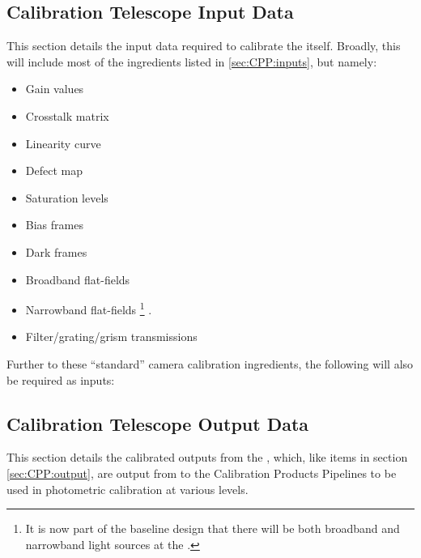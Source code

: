

\subsection{Calibration Telescope Input Data}
\label{sec:CPP:auxTelescope:inputs}
This section details the input data required to calibrate the \auxtelescope itself. Broadly, this will include most of the ingredients listed in \secsymbol\ref{sec:CPP:inputs}, but namely:

\begin{itemize}
	\item Gain values
	\item Crosstalk matrix
	\item Linearity curve
	\item Defect map
	\item Saturation levels
	\item Bias frames
	\item Dark frames
	\item Broadband flat-fields
	\item Narrowband flat-fields \footnote{It is now part of the baseline design that there will be both broadband and narrowband light sources at the \auxtelescope.} .
	\item Filter/grating/grism transmissions
\end{itemize}

Further to these ``standard'' camera calibration ingredients, the following will also be required as inputs:








\subsection{Calibration Telescope Output Data}
\label{sec:CPP:auxTelescope:outputs}
This section details the calibrated outputs from the \auxtelescope, which, like items in section \secsymbol\ref{sec:CPP:output}, are output from to the Calibration Products Pipelines to be used in photometric calibration at various levels.


